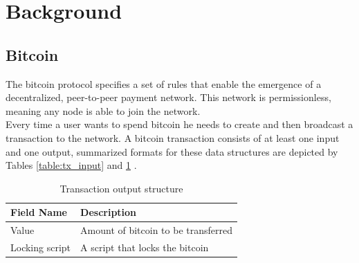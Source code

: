 \section{Background}
\label{sec:background}

\subsection{Bitcoin}
\label{ssection:bitcoin}

The bitcoin protocol \cite{bitcoin-core} specifies a set of rules that enable the emergence of a decentralized, peer-to-peer payment network. This network is permissionless, meaning any node is able to join the network.\\
Every time a user wants to spend bitcoin he needs to create and then broadcast a transaction to the network. A bitcoin transaction consists of at least one input and one output, summarized formats for these data structures are depicted by Tables \ref{table:tx_input} and \ref{table:tx_output} \cite{bitcoin_protocol_doc}.

\begin{table}[H]
\centering
{}
\caption{Transaction input structure}
\label{table:tx_input}
\end{table}

\begin{table}[H]
\centering
\begin{tabular}{|l|l|}
\hline
\rowcolor[HTML]{C0C0C0} 
Field Name & Description \\ \hline
Value & Amount of bitcoin to be transferred \\ \hline
Locking script & A script that locks the bitcoin \\ \hline
\end{tabular}
\caption{Transaction output structure}
\label{table:tx_output}
\end{table}

